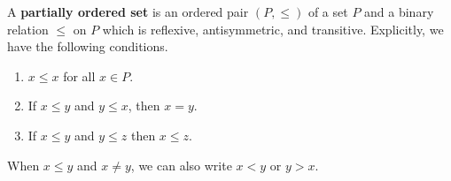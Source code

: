 \documentclass{puthesis-UG}
\begin{document}
\begin{defn}\label{def:poset}
	A \textbf{partially ordered set} is an ordered pair $(P, \leq)$ of a set $P$ and a binary relation $\leq$ on $P$ which is reflexive, antisymmetric, and transitive. Explicitly, we have the following conditions. 
	\begin{enumerate}[label = (\alph*)]
		\item $x \leq x$ for all $x \in P$.
		\item If $x \leq y$ and $y \leq x$, then $x = y$.
		\item If $x \leq y$ and $y \leq z$ then $x \leq z$.
	\end{enumerate}
	When $x \leq y$ and $x \neq y$, we can also write $x < y$ or $y > x$.
\end{defn}
\end{document}
